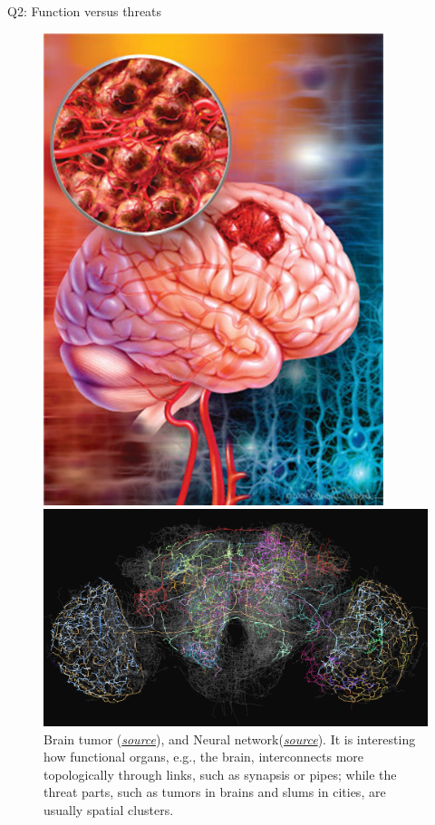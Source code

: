 \begin{frame}{Q2: Function versus threats}
    \begin{figure}
        \begin{minipage}{0.48\linewidth}
            \includegraphics[width = 0.4\linewidth]{Pics/braintumor.jpg}
        \end{minipage}
        \begin{minipage}{0.48\linewidth}
            \includegraphics[width = 1\linewidth]{Pics/simple-words-about-the-complex-what-are-neural-networks-1.png}
        \end{minipage}
        \caption{Brain tumor (\href{http://medicalxtourism.com/wp-content/uploads/2014/06/Brain-Cancer-Symptoms-and-Tumor-Survival-Rate-in-UK.jpg}{\textit{source}}), and Neural network(\href{http://gadget.fsetyt.com/wp-content/uploads/2017/06/simple-words-about-the-complex-what-are-neural-networks-1.png}{\textit{source}}). It is interesting how functional organs, e.g., the brain, interconnects more topologically through links, such as synapsis or pipes; while the threat parts, such as tumors in brains and slums in cities, are usually spatial clusters.
        } 
    \end{figure}
    
\end{frame}


